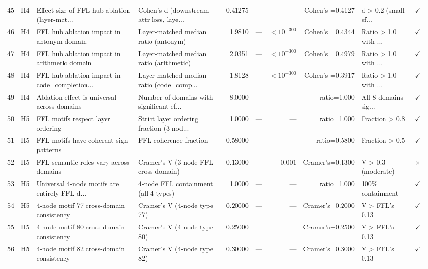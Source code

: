 \documentclass[11pt,a4paper]{article}
\begin{document}
\begin{landscape}
\begin{longtable}{rlp{3.2cm}p{3cm}rrrrp{1.5cm}l}
\rowcolor{rowgray}
45 & H4 & Effect size of FFL hub ablation (layer-mat... & Cohen's d (downstream attr loss, laye... & 0.41275 & --- & --- & Cohen's =0.4127 & d \textgreater{} 0.2 (small ef... & $\checkmark$ \\
46 & H4 & FFL hub ablation impact in antonym domain & Layer-matched median ratio (antonym) & 1.9810 & --- & $<10^{-300}$ & Cohen's =0.4344 & Ratio \textgreater{} 1.0 with ... & $\checkmark$ \\
\rowcolor{rowgray}
47 & H4 & FFL hub ablation impact in arithmetic domain & Layer-matched median ratio (arithmetic) & 2.0351 & --- & $<10^{-300}$ & Cohen's =0.4979 & Ratio \textgreater{} 1.0 with ... & $\checkmark$ \\
48 & H4 & FFL hub ablation impact in code\_completion... & Layer-matched median ratio (code\_comp... & 1.8128 & --- & $<10^{-300}$ & Cohen's =0.3917 & Ratio \textgreater{} 1.0 with ... & $\checkmark$ \\
\rowcolor{rowgray}
49 & H4 & Ablation effect is universal across domains & Number of domains with significant ef... & 8.0000 & --- & --- & ratio=1.000 & All 8 domains sig... & $\checkmark$ \\
\midrule
50 & H5 & FFL motifs respect layer ordering & Strict layer ordering fraction (3-nod... & 1.0000 & --- & --- & ratio=1.000 & Fraction \textgreater{} 0.8 & $\checkmark$ \\
\rowcolor{rowgray}
51 & H5 & FFL motifs have coherent sign patterns & FFL coherence fraction & 0.58000 & --- & --- & ratio=0.5800 & Fraction \textgreater{} 0.5 & $\checkmark$ \\
52 & H5 & FFL semantic roles vary across domains & Cramer's V (3-node FFL, cross-domain) & 0.13000 & --- & $0.001$ & Cramer's=0.1300 & V \textgreater{} 0.3 (moderate) & $\times$ \\
\rowcolor{rowgray}
53 & H5 & Universal 4-node motifs are entirely FFL-d... & 4-node FFL containment (all 4 types) & 1.0000 & --- & --- & ratio=1.000 & 100\% containment & $\checkmark$ \\
54 & H5 & 4-node motif 77 cross-domain consistency & Cramer's V (4-node type 77) & 0.20000 & --- & --- & Cramer's=0.2000 & V \textgreater{} FFL's 0.13 & $\checkmark$ \\
\rowcolor{rowgray}
55 & H5 & 4-node motif 80 cross-domain consistency & Cramer's V (4-node type 80) & 0.25000 & --- & --- & Cramer's=0.2500 & V \textgreater{} FFL's 0.13 & $\checkmark$ \\
56 & H5 & 4-node motif 82 cross-domain consistency & Cramer's V (4-node type 82) & 0.30000 & --- & --- & Cramer's=0.3000 & V \textgreater{} FFL's 0.13 & $\checkmark$ \\

\end{longtable}
\end{landscape}
\end{document}
